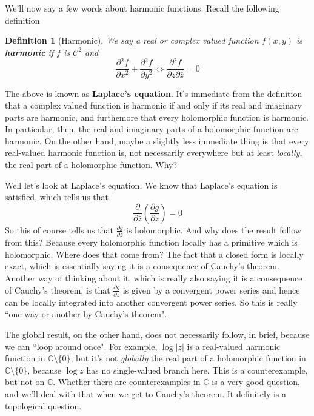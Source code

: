 \documentclass{article}
\newcommand{\mbb}[1]{\mathbb{#1}}
\newcommand{\mc}[1]{\mathcal{#1}}
\newcommand{\prt}[2]{{\frac{\partial {#1}}{\partial {#2}}}}
\newtheorem{definition}{Definition}
\begin{document}
We'll now say a few words about harmonic functions. Recall the following definition
\begin{definition}[Harmonic]
We say a real or complex valued function \(f(x, y)\) is \textbf{harmonic} if \(f\) is \(\mc{C}^2\) and
\begin{equation}\prt{^2f}{x^2} + \prt{^2f}{y^2} \iff \prt{^2f}{z\partial\bar{z}} = 0\end{equation}
\end{definition}
The above is known as \textbf{Laplace's equation}. It's immediate from the definition that a complex valued function is harmonic if and only if its real and imaginary parts are harmonic, and furthemore that every holomorphic function is harmonic. In particular, then, the real and imaginary parts of a holomorphic function are harmonic. On the other hand, maybe a slightly less immediate thing is that every real-valued harmonic function is, not necessarily everywhere but at least \textit{locally}, the real part of a holomorphic function. Why?

Well let's look at Laplace's equation. We know that Laplace's equation is satisfied, which tells us that
\begin{equation}\prt{}{\bar{z}}\left(\prt{g}{z}\right) = 0\end{equation}
So this of course tells us that \(\prt{g}{z}\) is holomorphic. And why does the result follow from this? Because every holomorphic function locally has a primitive which is holomorphic. Where does that come from? The fact that a closed form is locally exact, which is essentially saying it is a consequence of Cauchy's theorem. Another way of thinking about it, which is really also saying it is a consequence of Cauchy's theorem, is that \(\prt{g}{z}\) is given by a convergent power series and hence can be locally integrated into another convergent power series. So this is really ``one way or another by Cauchy's theorem".

The global result, on the other hand, does not necessarily follow, in brief, because we can ``loop around once". For example, \(\log|z|\) is a real-valued harmonic function in \(\mbb{C} \setminus \{0\}\), but it's not \textit{globally} the real part of a holomorphic function in \(\mbb{C} \setminus \{0\}\), because \(\log z\) has no single-valued branch here. This is a counterexample, but not on \(\mbb{C}\). Whether there are counterexamples in \(\mbb{C}\) is a very good question, and we'll deal with that when we get to Cauchy's theorem. It definitely is a topological question.
\end{document}
